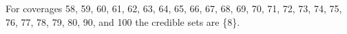 For coverages 58, 59, 60, 61, 62, 63, 64, 65, 66, 67, 68, 69, 70, 71, 72, 73, 74, 75, 76, 77, 78, 79, 80, 90, and 100 the credible sets are \{8\}. 